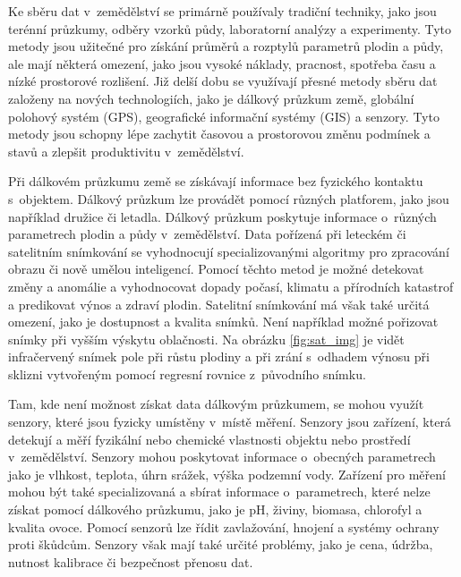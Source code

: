 Ke sběru dat v~zemědělství se primárně používaly tradiční techniky, jako jsou terénní průzkumy, odběry vzorků půdy, laboratorní analýzy a experimenty. Tyto metody jsou užitečné pro získání průměrů a rozptylů parametrů plodin a půdy, ale mají některá omezení, jako jsou vysoké náklady, pracnost, spotřeba času a nízké prostorové rozlišení. Již delší dobu se využívají přesné metody sběru dat založeny na nových technologiích, jako je dálkový průzkum země, globální polohový systém (GPS), geografické informační systémy (GIS) a senzory. Tyto metody jsou schopny lépe zachytit časovou a prostorovou změnu podmínek a stavů a zlepšit produktivitu v~zemědělství. \cite{shibusawa2009data} 

Při dálkovém průzkumu země se získávají informace bez fyzického kontaktu s~objektem. Dálkový průzkum lze provádět pomocí různých platforem, jako jsou například družice či letadla. Dálkový průzkum poskytuje informace o~různých parametrech plodin a půdy v~zemědělství. Data pořízená při leteckém či satelitním snímkování se vyhodnocují specializovanými algoritmy pro zpracování obrazu či nově umělou inteligencí. Pomocí těchto metod je možné detekovat změny a anomálie a vyhodnocovat dopady počasí, klimatu a přírodních katastrof a predikovat výnos a zdraví plodin. Satelitní snímkování má však také určitá omezení, jako je dostupnost a kvalita snímků. Není například možné pořizovat snímky při vyšším výskytu oblačnosti. Na obrázku \ref{fig:sat_img} je vidět infračervený snímek pole při růstu plodiny a při zrání s~odhadem výnosu při sklizni vytvořeným pomocí regresní rovnice z~původního snímku. \cite{DC_SATELITE}

Tam, kde není možnost získat data dálkovým průzkumem, se mohou využít senzory, které jsou fyzicky umístěny v~místě měření. Senzory jsou zařízení, která detekují a měří fyzikální nebo chemické vlastnosti objektu nebo prostředí v~zemědělství. Senzory mohou poskytovat informace o~obecných parametrech jako je vlhkost, teplota, úhrn srážek, výška podzemní vody. Zařízení pro měření mohou být také specializovaná a sbírat informace o~parametrech, které nelze získat pomocí dálkového průzkumu, jako je pH, živiny, biomasa, chlorofyl a kvalita ovoce. Pomocí senzorů lze řídit zavlažování, hnojení a systémy ochrany proti škůdcům. Senzory však mají také určité problémy, jako je cena, údržba, nutnost kalibrace či bezpečnost přenosu dat. \cite{li2010sensors}

